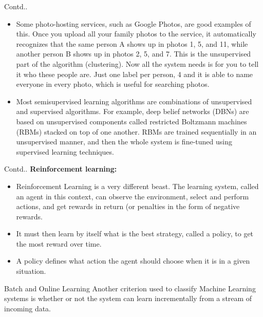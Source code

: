 \documentclass{beamer}
\begin{document}
\begin{frame}
\begin{block}{Contd..}
\begin{itemize}
     \item Some photo-hosting services, such as Google Photos, are good examples of this. Once you upload all your family photos to the service, it automatically recognizes that the same person A shows up in photos 1, 5, and 11, while another person B shows up in photos 2, 5, and 7. This is the unsupervised part of the algorithm (clustering). Now all the system needs is for you to tell it who these people are. Just one label per person, 4 and it is able to name everyone in every photo, which is useful for searching photos.
    \item Most semisupervised learning algorithms are combinations of unsupervised and supervised algorithms. For example, deep belief networks (DBNs) are based on unsupervised components called restricted Boltzmann machines (RBMs) stacked on top of one another. RBMs are trained sequentially in an unsupervised manner, and then the whole system is fine-tuned using supervised learning techniques.
\end{itemize}
\end{block}
\end{frame}
\begin{frame}
\begin{block}{Contd..}
\textbf{Reinforcement learning:}\\
\begin{itemize}
    \item Reinforcement Learning is a very different beast. The learning system, called an agent in this context, can observe the environment, select and perform actions, and get rewards in return (or penalties in the form of negative rewards.
    \item It must then learn by itself what is the best strategy, called a policy, to get the most reward over time.
    \item A policy defines what action the agent should choose when it is in a given situation.
\end{itemize}
\end{block}
\begin{block}{Batch and Online Learning}
Another criterion used to classify Machine Learning systems is whether or not the system can learn incrementally from a stream of incoming data.\\
\end{block}
\end{frame}
\end{document}
